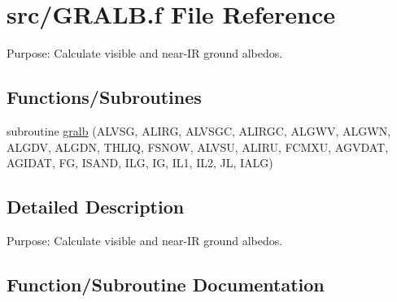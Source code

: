 \hypertarget{GRALB_8f}{}\section{src/\+G\+R\+A\+L\+B.f File Reference}
\label{GRALB_8f}


Purpose\+: Calculate visible and near-\/\+I\+R ground albedos.  


\subsection*{Functions/\+Subroutines}
\begin{DoxyCompactItemize}
\item 
subroutine \hyperlink{GRALB_8f_a99502ab3789165086e450da1aef1ecd5}{gralb} (A\+L\+V\+S\+G, A\+L\+I\+R\+G, A\+L\+V\+S\+G\+C, A\+L\+I\+R\+G\+C, A\+L\+G\+W\+V, A\+L\+G\+W\+N, A\+L\+G\+D\+V, A\+L\+G\+D\+N, T\+H\+L\+I\+Q, F\+S\+N\+O\+W, A\+L\+V\+S\+U, A\+L\+I\+R\+U, F\+C\+M\+X\+U, A\+G\+V\+D\+A\+T, A\+G\+I\+D\+A\+T, F\+G, I\+S\+A\+N\+D, I\+L\+G, I\+G, I\+L1, I\+L2, J\+L, I\+A\+L\+G)
\end{DoxyCompactItemize}


\subsection{Detailed Description}
Purpose\+: Calculate visible and near-\/\+I\+R ground albedos. 



\subsection{Function/\+Subroutine Documentation}
\hypertarget{GRALB_8f_a99502ab3789165086e450da1aef1ecd5}{}
